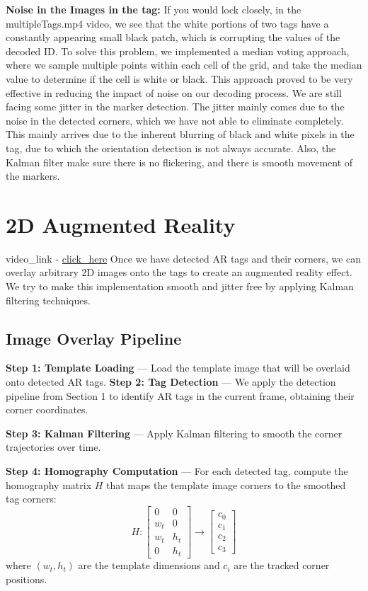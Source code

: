\documentclass[9pt,a4paper,twocolumn,twoside]{tau-class/tau}
\begin{document}
    \textbf{Noise in the Images in the tag:} If you would lock closely, in the multipleTags.mp4 video, we see that the white portions of two tags have a constantly appearing small black patch, which is corrupting the values of the decoded ID. To solve this problem, we implemented a median voting approach, where we sample multiple points within each cell of the grid, and take the median value to determine if the cell is white or black. This approach proved to be very effective in reducing the impact of noise on our decoding process.
    \newline
    We are still facing some jitter in the marker detection. The jitter mainly comes due to the noise in the detected corners, which we have not able to eliminate completely. This mainly arrives due to the inherent blurring of black and white pixels in the tag, due to which the orientation detection is not always accurate. Also, the Kalman filter make sure there is no flickering, and there is smooth movement of the markers.

\section{2D Augmented Reality}
    video\_link - \href{https://drive.google.com/drive/folders/1bwCFEDMHWHSVKO8GLuNlM5NxsSlA9aG5?usp=sharing}{click\_here}
    \newline
    Once we have detected AR tags and their corners, we can overlay arbitrary 2D images onto the tags to create an augmented reality effect. We try to make this implementation smooth and jitter free by applying Kalman filtering techniques.

    \subsection{Image Overlay Pipeline}

    \textbf{Step 1: Template Loading} — Load the template image that will be overlaid onto detected AR tags. 
    \textbf{Step 2: Tag Detection} — We apply the detection pipeline from Section 1 to identify AR tags in the current frame, obtaining their corner coordinates.

    \textbf{Step 3: Kalman Filtering} — Apply Kalman filtering to smooth the corner trajectories over time. 

    \textbf{Step 4: Homography Computation} — For each detected tag, compute the homography matrix $H$ that maps the template image corners to the smoothed tag corners:
    \begin{equation}
        H: \begin{bmatrix} 0 & 0 \\ w_t & 0 \\ w_t & h_t \\ 0 & h_t \end{bmatrix} \rightarrow \begin{bmatrix} c_0 \\ c_1 \\ c_2 \\ c_3 \end{bmatrix}
    \end{equation}
    where $(w_t, h_t)$ are the template dimensions and $c_i$ are the tracked corner positions.
\end{document}
